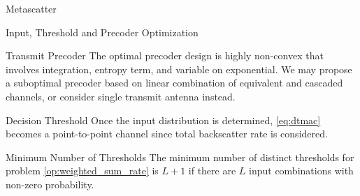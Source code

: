 \documentclass[9pt]{beamer}
\begin{document}
\begin{section}{Metascatter}
\begin{subsection}{Input, Threshold and Precoder Optimization}
			\begin{frame}{Transmit Precoder}
				The optimal precoder design is highly non-convex that involves integration, entropy term, and variable on exponential. We may propose a suboptimal precoder based on linear combination of equivalent and cascaded channels, or consider single transmit antenna instead.
			\end{frame}

			\begin{frame}{Decision Threshold}
				Once the input distribution is determined, \eqref{eq:dtmac} becomes a point-to-point channel since total backscatter rate is considered.

				\vspace{1em}
				\begin{block}{Minimum Number of Thresholds}
					The minimum number of distinct thresholds for problem \eqref{op:weighted_sum_rate} is $L+1$ if there are $L$ input combinations with non-zero probability.
				\end{block}
				\vspace{1em}
			\end{frame}
		\end{subsection}
	\end{section}
\end{document}
